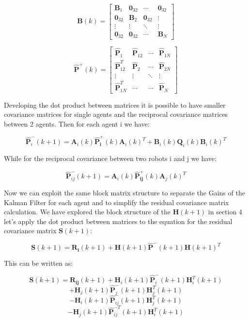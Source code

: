 \documentclass[conference]{IEEEtran}
\begin{document}
 $$ \mathbf{B}(k) =  \begin{bmatrix} \mathbf{B}_{1} &  \mathbf{0}_{32} &\cdots & \mathbf{0}_{32} \\  \mathbf{0}_{32} & \mathbf{B}_{2} &  \mathbf{0}_{32} & \vdots \\ \vdots & \vdots & \ddots & \vdots \\ \mathbf{0}_{32} &  \mathbf{0}_{32} &\cdots& \mathbf{B}_{N} \end{bmatrix}$$

 $$ \mathbf{\hat{P}}^{+}(k) =  \begin{bmatrix} \mathbf{\hat{P}}_{1} &  \mathbf{\hat{P}}_{12} &\cdots & \mathbf{\hat{P}}_{1N} \\  \mathbf{\hat{P}}_{12}^{T} & \mathbf{\hat{P}}_{2} &  \cdots & \mathbf{\hat{P}}_{2N} \\ \vdots & \vdots & \ddots & \vdots \\ \mathbf{\hat{P}}_{1N}^{T} &  \cdots &\cdots& \mathbf{\hat{P}}_{N} \end{bmatrix}$$

Developing the dot product between matrices it is possible to have smaller covariance matrices for single agents and the reciprocal covariance matrices between 2 agents. Then for each agent i we have:

$$  \mathbf{\hat{P}}_{i}^{-}(k+1) =  \mathbf{A}_{i}(k)\mathbf{{\hat{P}}_{i}^{+}}(k)\mathbf{A}_{i}(k)^{T} + \mathbf{B}_{i}(k)\mathbf{Q}_{i}(k) \mathbf{B}_{i}(k)^{T} $$

While for the reciprocal covariance between two robots i and j we have:

$$  \mathbf{\hat{P}}_{ij}^{-}(k+1) =  \mathbf{A}_{i}(k)\mathbf{{\hat{P}}_{ij}^{+}}(k)\mathbf{A}_{j}(k)^{T} $$

Now we can exploit the same block matrix structure to separate the Gains of the Kalman Filter for each agent and to simplify the residual covariance matrix calculation. We have explored the block structure of the $\mathbf{H}(k+1)$ in section 4 let's apply the dot product between matrices to the equation for the residual covariance matrix $\mathbf{S}(k+1)$:

$$ \mathbf{S}(k+1) = \mathbf{R_{i}}(k+1) + \mathbf{H}(k+1)\mathbf{\hat{P}}^{-}(k+1)\mathbf{H}(k+1)^{T} $$

This can be written as:

$$ \mathbf{S}(k+1) = \mathbf{R_{ij}}(k+1) + \mathbf{H}_{i}(k+1)\mathbf{\hat{P}}_{i}^{-}(k+1)\mathbf{H}_{i}^{T}(k+1)$$
$$ +\mathbf{H}_{j}(k+1)\mathbf{\hat{P}}_{j}^{-}(k+1)\mathbf{H}_{j}^{T}(k+1)$$
$$ - \mathbf{H}_{i}(k+1)\mathbf{\hat{P}}_{ij}^{-}(k+1)\mathbf{H}_{j}^{T}(k+1)$$
$$ - \mathbf{H}_{j}(k+1)\mathbf{\hat{P}}_{ij}^{-T}(k+1)\mathbf{H}_{i}^{T} (k+1)$$
\end{document}
